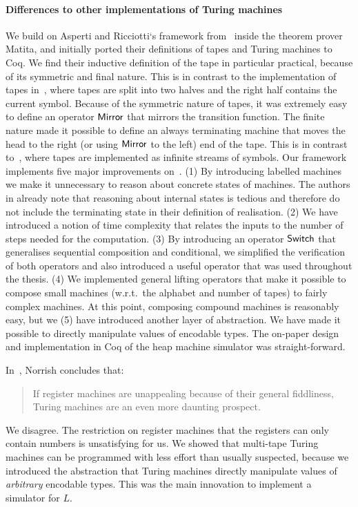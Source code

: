 \paragraph{Differences to other implementations of Turing machines}
We build on Asperti and Ricciotti`s framework from~\cite{asperti2015} inside the theorem prover Matita, and initially ported their definitions of
tapes and Turing machines to Coq.  We find their inductive definition of the tape in particular practical, because of its symmetric and final nature.
This is in contrast to the implementation of tapes in~\cite{xu2013}, where tapes are split into two halves and the right half contains the current
symbol.  Because of the symmetric nature of tapes, it was extremely easy to define an operator $\mathsf{Mirror}$ that mirrors the transition function.
The finite nature made it possible to define an always terminating machine that moves the head to the right (or using $\mathsf{Mirror}$ to the left) end
of the tape.  This is in contrast to~\cite{ciaffaglione2016}, where tapes are implemented as infinite streams of symbols.  Our framework implements
five major improvements on~\cite{asperti2015}.  (1) By introducing labelled machines we make it unnecessary to reason about concrete states of
machines.  The authors in \cite{asperti2015} already note that reasoning about internal states is tedious and therefore do not include the terminating
state in their definition of realisation.  (2) We have introduced a notion of time complexity that relates the inputs to the number of steps needed
for the computation.  (3) By introducing an operator $\mathsf{Switch}$ that generalises sequential composition and conditional, we simplified the verification
of both operators and also introduced a useful operator that was used throughout the thesis.  (4) We implemented general lifting operators that make
it possible to compose small machines (w.r.t.\ the alphabet and number of tapes) to fairly complex machines.  At this point, composing compound
machines is reasonably easy, but we (5) have introduced another layer of abstraction.  We have made it possible to directly manipulate values of
encodable types.  The on-paper design and implementation in Coq of the heap machine simulator was straight-forward.


In~\cite{NorrishComputabilityTheory}, Norrish concludes that:
\begin{quote}
  If register machines are unappealing because of their general fiddliness, Turing machines are an even more daunting prospect.
\end{quote}
We disagree.  The restriction on register machines that the registers can only contain numbers is unsatisfying for us.  We showed that multi-tape
Turing machines can be programmed with less effort than usually suspected, because we introduced the abstraction that Turing machines directly
manipulate values of \textit{arbitrary} encodable types.  This was the main innovation to implement a simulator for $L$.


